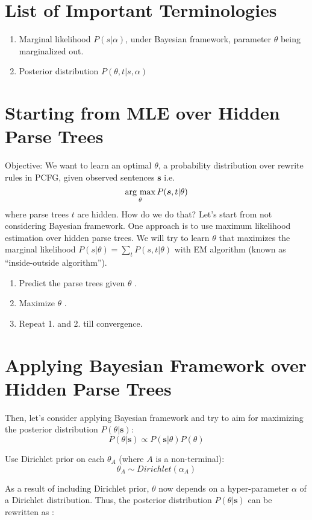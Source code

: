 \documentclass[11pt]{article}
\newcommand{\argmax}{\mathop{\rm arg~max}\limits}
\begin{document}
\section{List of Important Terminologies}
\begin{enumerate}
 \item Marginal likelihood $P(s|\alpha)$, under Bayesian framework, parameter $\theta$ being marginalized out.
 \item Posterior distribution $P(\theta,t|s,\alpha)$ 
\end{enumerate}

\section{Starting from MLE over Hidden Parse Trees}
Objective: We want to learn an optimal $\theta$, a probability distribution over rewrite rules in PCFG, given observed sentences $\boldsymbol{s}$ i.e. 
$$
\argmax_{\theta} P(\boldsymbol{s}, t|\theta)
$$
where parse trees $t$ are hidden. How do we do that? Let's start from not considering Bayesian framework. One approach is to use maximum likelihood estimation over hidden parse trees. We will try to learn $\theta$ that maximizes the marginal likelihood $P(s|\theta) = \sum_t P(s, t|\theta)$ with EM algorithm (known as ``inside-outside algorithm'').
\begin{enumerate}
 \item Predict the parse trees given $\theta$ \cite{learning_tree_annotation}.
 \item Maximize $\theta$ \cite{learning_tree_annotation}.
 \item Repeat 1. and 2. till convergence.
\end{enumerate}


\section{Applying Bayesian Framework over Hidden Parse Trees}
Then, let's consider applying Bayesian framework and try to aim for maximizing the posterior distribution $P(\theta|\boldsymbol{s})$:
$$
P(\theta|\boldsymbol{s}) \propto P(\boldsymbol{s}|\theta) P(\theta)
$$

Use Dirichlet prior on each $\theta_A$ (where $A$ is a non-terminal):
$$
\theta_A \sim Dirichlet(\alpha_A) 
$$

As a result of including Dirichlet prior, $\theta$ now depends on a hyper-parameter $\alpha$ of a Dirichlet distribution. Thus, the posterior distribution $P(\theta|\boldsymbol{s})$ can be rewritten as \cite{cohen-johnson:2013:ACL2013}:
\end{document}

